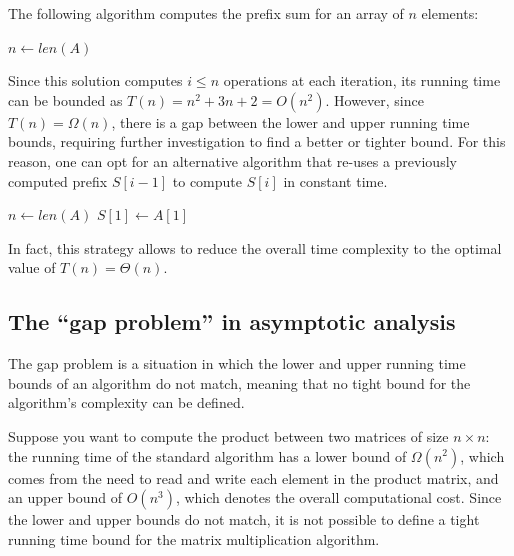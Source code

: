 \documentclass{report}
\begin{document}
\begin{examplebox}
    The following algorithm computes the prefix sum for an array of $\displaystyle n$ elements:
    \begin{algorithm}[H]
    
        $n \gets len(A)$\;
        \;
    \end{algorithm}
    \noindent Since this solution computes $\displaystyle i \leq n$ operations at each iteration, its running time can be bounded as $\displaystyle T(n) = n^2 + 3n + 2 = O(n^2)$. \newline
    However, since $\displaystyle T(n) = \Omega(n)$, there is a gap between the lower and upper running time bounds, requiring further investigation to find a better or tighter bound. \newline
    For this reason, one can opt for an alternative algorithm that re-uses a previously computed prefix $\displaystyle S[i - 1]$ to compute $\displaystyle S[i]$ in constant time.
    \begin{algorithm}[H]
    
        $n \gets len(A)$\;
        $S[1] \gets A[1]$\;
        \;
    \end{algorithm}
    \noindent In fact, this strategy allows to reduce the overall time complexity to the optimal value of $\displaystyle T(n) = \Theta(n)$.
\end{examplebox}
\subsection{The ``gap problem'' in asymptotic analysis}
The gap problem is a situation in which the lower and upper running time bounds of an algorithm do not match, meaning that no tight bound for the algorithm's complexity can be defined.
\begin{examplebox}
    Suppose you want to compute the product between two matrices of size $\displaystyle n \times n$: the running time of the standard algorithm has a lower bound of $\displaystyle \Omega(n^2)$, which comes from the need to read and write each element in the product matrix, and an upper bound of $\displaystyle O(n^3)$, which denotes the overall computational cost. \newline
    Since the lower and upper bounds do not match, it is not possible to define a tight running time bound for the matrix multiplication algorithm.
\end{examplebox}
\end{document}
